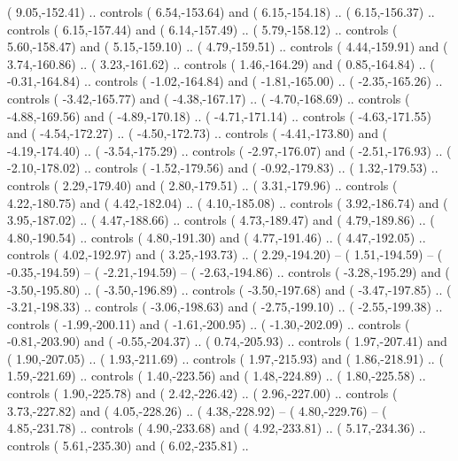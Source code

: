 {        (   9.05,-152.41) .. controls (   6.54,-153.64) and (   6.15,-154.18) ..
        (   6.15,-156.37) .. controls (   6.15,-157.44) and (   6.14,-157.49) ..
        (   5.79,-158.12) .. controls (   5.60,-158.47) and (   5.15,-159.10) ..
        (   4.79,-159.51) .. controls (   4.44,-159.91) and (   3.74,-160.86) ..
        (   3.23,-161.62) .. controls (   1.46,-164.29) and (   0.85,-164.84) ..
        (  -0.31,-164.84) .. controls (  -1.02,-164.84) and (  -1.81,-165.00) ..
        (  -2.35,-165.26) .. controls (  -3.42,-165.77) and (  -4.38,-167.17) ..
        (  -4.70,-168.69) .. controls (  -4.88,-169.56) and (  -4.89,-170.18) ..
        (  -4.71,-171.14) .. controls (  -4.63,-171.55) and (  -4.54,-172.27) ..
        (  -4.50,-172.73) .. controls (  -4.41,-173.80) and (  -4.19,-174.40) ..
        (  -3.54,-175.29) .. controls (  -2.97,-176.07) and (  -2.51,-176.93) ..
        (  -2.10,-178.02) .. controls (  -1.52,-179.56) and (  -0.92,-179.83) ..
        (   1.32,-179.53) .. controls (   2.29,-179.40) and (   2.80,-179.51) ..
        (   3.31,-179.96) .. controls (   4.22,-180.75) and (   4.42,-182.04) ..
        (   4.10,-185.08) .. controls (   3.92,-186.74) and (   3.95,-187.02) ..
        (   4.47,-188.66) .. controls (   4.73,-189.47) and (   4.79,-189.86) ..
        (   4.80,-190.54) .. controls (   4.80,-191.30) and (   4.77,-191.46) ..
        (   4.47,-192.05) .. controls (   4.02,-192.97) and (   3.25,-193.73) ..
        (   2.29,-194.20) -- 
        (   1.51,-194.59) -- 
        (  -0.35,-194.59) -- 
        (  -2.21,-194.59) -- 
        (  -2.63,-194.86) .. controls (  -3.28,-195.29) and (  -3.50,-195.80) ..
        (  -3.50,-196.89) .. controls (  -3.50,-197.68) and (  -3.47,-197.85) ..
        (  -3.21,-198.33) .. controls (  -3.06,-198.63) and (  -2.75,-199.10) ..
        (  -2.55,-199.38) .. controls (  -1.99,-200.11) and (  -1.61,-200.95) ..
        (  -1.30,-202.09) .. controls (  -0.81,-203.90) and (  -0.55,-204.37) ..
        (   0.74,-205.93) .. controls (   1.97,-207.41) and (   1.90,-207.05) ..
        (   1.93,-211.69) .. controls (   1.97,-215.93) and (   1.86,-218.91) ..
        (   1.59,-221.69) .. controls (   1.40,-223.56) and (   1.48,-224.89) ..
        (   1.80,-225.58) .. controls (   1.90,-225.78) and (   2.42,-226.42) ..
        (   2.96,-227.00) .. controls (   3.73,-227.82) and (   4.05,-228.26) ..
        (   4.38,-228.92) -- 
        (   4.80,-229.76) -- 
        (   4.85,-231.78) .. controls (   4.90,-233.68) and (   4.92,-233.81) ..
        (   5.17,-234.36) .. controls (   5.61,-235.30) and (   6.02,-235.81) ..
}
